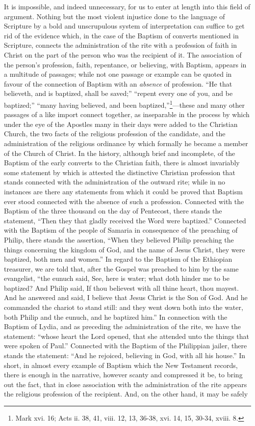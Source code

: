 \documentclass[english,]{book}
\begin{document}
It is impossible, and indeed unnecessary, for us to enter at length into this field of argument. Nothing but the most violent injustice done to the language of Scripture by a bold and unscrupulous system of interpretation can suffice to get rid of the evidence which, in the case of the Baptism of converts mentioned in Scripture, connects the administration of the rite with a profession of faith in Christ on the part of the person who was the recipient of it. The association of the person's profession, faith, repentance, or believing, with Baptism, appears in a multitude of passages; while not one passage or example can be quoted in favour of the connection of Baptism with an \emph{absence} of profession. ``He that believeth, and is baptized, shall be saved;'' ``repent every one of you, and be baptized;'' ``many having believed, and been baptized,''\footnote{Mark xvi. 16; Acts ii. 38, 41, viii. 12, 13, 36-38, xvi. 14, 15, 30-34, xviii. 8.}---these and many other passages of a like import connect together, as inseparable in the process by which under the eye of the Apostles many in their days were added to the Christian Church, the two facts of the religious profession of the candidate, and the administration of the religious ordinance by which formally he became a member of the Church of Christ. In the history, although brief and incomplete, of the Baptism of the early converts to the Christian faith, there is almost invariably some statement by which is attested the distinctive Christian profession that stands connected with the administration of the outward rite; while in no instances are there any statements from which it could be proved that Baptism ever stood connected with the absence of such a profession. Connected with the Baptism of the three thousand on the day of Pentecost, there stands the statement, ``Then they that gladly received the Word were baptized.'' Connected with the Baptism of the people of Samaria in consequence of the preaching of Philip, there stands the assertion, ``When they believed Philip preaching the things concerning the kingdom of God, and the name of Jesus Christ, they were baptized, both men and women.'' In regard to the Baptism of the Ethiopian treasurer, we are told that, after the Gospel was preached to him by the same evangelist, ``the eunuch said, See, here is water; what doth hinder me to be baptized? And Philip said, If thou believest with all thine heart, thou mayest. And he answered and said, I believe that Jesus Christ is the Son of God. And he commanded the chariot to stand still: and they went down both into the water, both Philip and the eunuch, and he baptized him.'' In connection with the Baptism of Lydia, and as preceding the administration of the rite, we have the statement: ``whose heart the Lord opened, that she attended unto the things that were spoken of Paul.'' Connected with the Baptism of the Philippian jailer, there stands the statement: ``And he rejoiced, believing in God, with all his house.'' In short, in almost every example of Baptism which the New Testament records, there is enough in the narrative, however scanty and compressed it be, to bring out the fact, that in close association with the administration of the rite appears the religious profession of the recipient. And, on the other hand, it may be safely 
\end{document}
